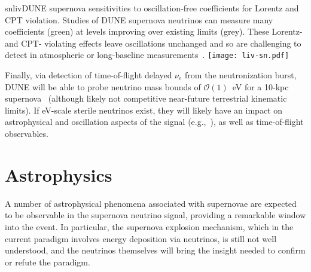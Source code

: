 \begin{dunefigure}{snliv}{DUNE supernova sensitivities to oscillation-free coefficients for Lorentz and CPT violation. Studies of DUNE supernova neutrinos can measure many coefficients (green) at levels improving over existing limits (grey). These Lorentz- and CPT- violating effects leave oscillations unchanged and so are challenging to detect in atmospheric or long-baseline measurements~\cite{kostelecky}.\label{fig:livsn}}
\texttt{[image: liv-sn.pdf]}
\end{dunefigure}

Finally, via detection of time-of-flight delayed $\nu_e$ from the  neutronization burst,  DUNE will be able to probe neutrino mass bounds of $\mathcal{O}(1)$~eV for a 10-kpc supernova~\cite{Rossi-Torres:2015rla} (although likely not competitive near-future terrestrial kinematic limits).  If eV-scale sterile neutrinos exist, they will likely have an impact on astrophysical and oscillation aspects of the signal (e.g.,~\cite{Keranen:2007ga,Tamborra:2011is,Esmaili:2014gya}), as well as time-of-flight observables. \\


\section{Astrophysics}
\label{sec:physics-snblowe-astrophysics}


A number of astrophysical phenomena associated with supernovae are expected to be observable
in the supernova neutrino signal, providing a remarkable window into the event.  In particular, the supernova explosion mechanism, which in the current paradigm involves energy deposition via neutrinos, is still not well understood, and the neutrinos themselves will bring the insight needed to confirm or refute the paradigm.

